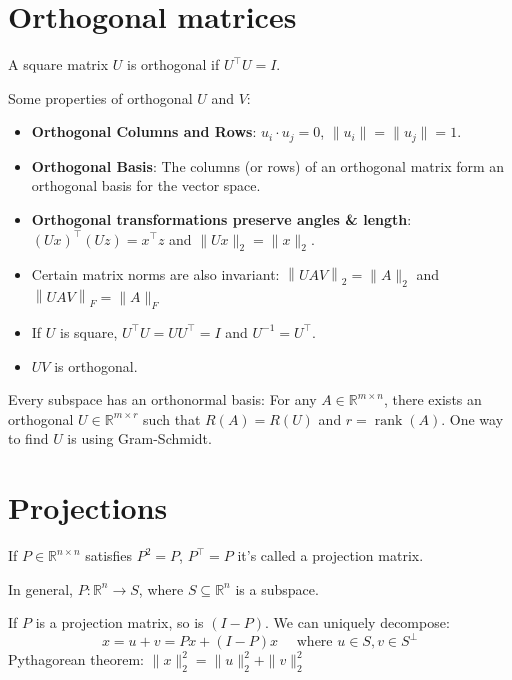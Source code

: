 \documentclass[14pt]{article}
\theoremstyle{definition}
\theoremstyle{remark}
\begin{document}
\begin{multicols}{2}

    \section{Orthogonal matrices}
    A square matrix $U$ is orthogonal if $U^{\top} U=I$.

    Some properties of orthogonal $U$ and $V$:
    \begin{itemize}
        \item \textbf{Orthogonal Columns and Rows}: $u_i\cdot u_j = 0$, $\|u_i\|=\|u_j\|=1$.

        \item \textbf{Orthogonal Basis}: The columns (or rows) of an orthogonal matrix form an orthogonal basis for the vector space.
        \item \textbf{Orthogonal transformations preserve angles \& length}: $(U x)^{\top}(U z)=x^{\top} z$ and $\|U x\|_{2}=\|x\|_{2}$.

        \item Certain matrix norms are also invariant: $\left\|U A V\right\|_{2}=\|A\|_{2}$ and $\left\|U A V\right\|_{F}=\|A\|_{F}$

        \item If $U$ is square, $U^{\top} U=U U^{\top}=I$ and $U^{-1}=U^{\top}$.

        \item $U V$ is orthogonal.

    \end{itemize}

    Every subspace has an orthonormal basis: For any $A \in \mathbb{R}^{m \times n}$, there exists an orthogonal $U \in \mathbb{R}^{m \times r}$ such that $R(A)=R(U)$ and $r=\operatorname{rank}(A)$. One way to find $U$ is using Gram-Schmidt.


    \columnbreak


    \section{Projections}
    If $P \in \mathbb{R}^{n \times n}$ satisfies $P^{2}=P$, $P^\top = P$ it's called a projection matrix.

    In general, $P: \mathbb{R}^{n} \rightarrow S$, where $S \subseteq \mathbb{R}^{n}$ is a subspace.

    If $P$ is a projection matrix, so is $(I-P)$. We can uniquely decompose:
    \[
        x=u+v = P x + (I-P) x \quad  \text { where } u \in S, v \in S^{\perp}
    \]
    Pythagorean theorem: $\|x\|_{2}^{2}=\|u\|_{2}^{2}+\|v\|_{2}^{2}$


\end{multicols}
\end{document}
